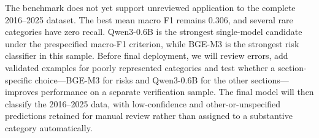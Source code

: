 The benchmark does not yet support unreviewed application to the complete 2016--2025 dataset. The best mean macro F1 remains 0.306, and several rare categories have zero recall. Qwen3-0.6B is the strongest single-model candidate under the prespecified macro-F1 criterion, while BGE-M3 is the strongest risk classifier in this sample. Before final deployment, we will review errors, add validated examples for poorly represented categories and test whether a section-specific choice---BGE-M3 for risks and Qwen3-0.6B for the other sections---improves performance on a separate verification sample. The final model will then classify the 2016--2025 data, with low-confidence and other-or-unspecified predictions retained for manual review rather than assigned to a substantive category automatically.

